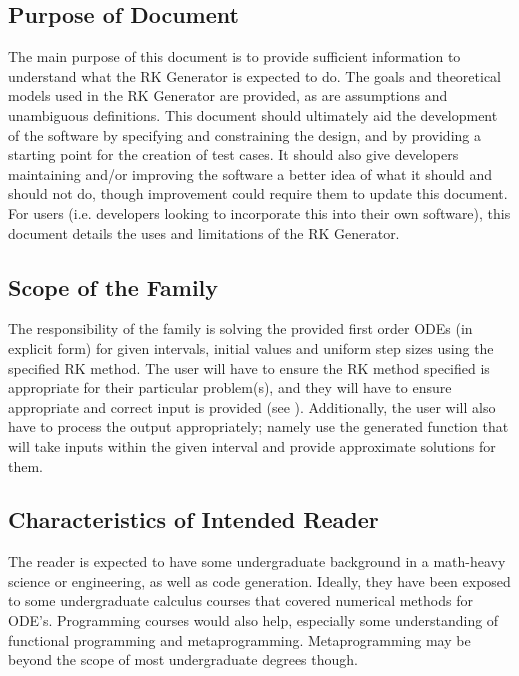 \documentclass[12pt]{article}
\newcommand{\famname}{RK Generator} %
\begin{document}
\subsection{Purpose of Document}
The main purpose of this document is to provide sufficient information to 
understand what the \famname{} is expected to do.
The goals and theoretical models used in the \famname{} are provided, as are 
assumptions and unambiguous definitions.
This document should ultimately aid the development of the software by 
specifying and constraining the design, and by providing a starting point for 
the creation of test cases.
It should also give developers maintaining and/or improving the software a 
better idea of what it should and should not do, though improvement could 
require them to update this document.
For users (i.e. developers looking to incorporate this into their own 
software), this document details the uses and limitations of the \famname{}.

\subsection{Scope of the Family}
The responsibility of the family is solving the provided first order ODEs (in 
explicit form) for given intervals, initial values and uniform step sizes using 
the specified RK method. The 
user will have to ensure the RK method specified is appropriate for their 
particular problem(s), and they will have to ensure appropriate and correct 
input is provided (see ). 
Additionally, the user will also have to process the output appropriately; 
namely use the generated function that will take inputs within the given 
interval and provide approximate solutions for them.

\subsection{Characteristics of Intended Reader} 
The reader is expected to have some undergraduate background in a math-heavy 
science or engineering, as well as code generation. Ideally, they have been 
exposed to some undergraduate calculus courses that covered numerical methods 
for ODE's.
Programming courses would also help, especially some understanding of 
functional programming and metaprogramming. 
Metaprogramming may be beyond the scope of most undergraduate degrees though.
\end{document}
